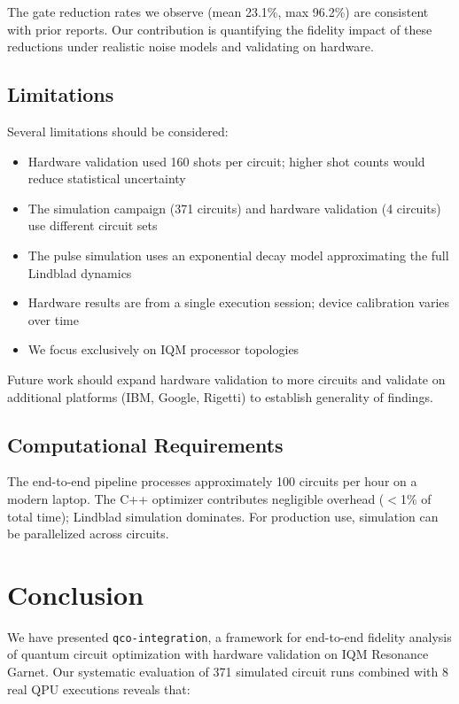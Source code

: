 \documentclass[journal]{IEEEtran}
\begin{document}
The gate reduction rates we observe (mean 23.1\%, max 96.2\%) are consistent with prior reports. Our contribution is quantifying the fidelity impact of these reductions under realistic noise models and validating on hardware.

\subsection{Limitations}

Several limitations should be considered:

\begin{itemize}
    \item Hardware validation used 160 shots per circuit; higher shot counts would reduce statistical uncertainty
    \item The simulation campaign (371 circuits) and hardware validation (4 circuits) use different circuit sets
    \item The pulse simulation uses an exponential decay model approximating the full Lindblad dynamics
    \item Hardware results are from a single execution session; device calibration varies over time
    \item We focus exclusively on IQM processor topologies
\end{itemize}

Future work should expand hardware validation to more circuits and validate on additional platforms (IBM, Google, Rigetti) to establish generality of findings.

\subsection{Computational Requirements}

The end-to-end pipeline processes approximately 100 circuits per hour on a modern laptop. The C++ optimizer contributes negligible overhead ($<$1\% of total time); Lindblad simulation dominates. For production use, simulation can be parallelized across circuits.

\section{Conclusion}
\label{sec:conclusion}

We have presented \texttt{qco-integration}, a framework for end-to-end fidelity analysis of quantum circuit optimization with hardware validation on IQM Resonance Garnet. Our systematic evaluation of 371 simulated circuit runs combined with 8 real QPU executions reveals that:
\end{document}

